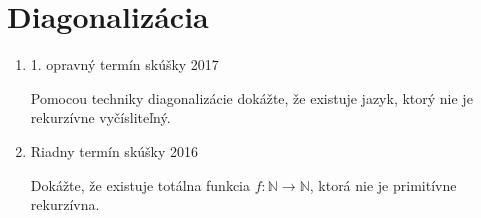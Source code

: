 \documentclass[]{article}
\begin{document}
	
	\section{Diagonalizácia}
	
	\begin{enumerate}
		\item 1. opravný termín skúšky 2017
		
		Pomocou techniky diagonalizácie dokážte, že existuje jazyk, ktorý nie je rekurzívne vyčísliteľný.
		\item Riadny termín skúšky 2016
		
		Dokážte, že existuje totálna funkcia $f: \mathbb{N} \rightarrow \mathbb{N}$, ktorá nie je primitívne rekurzívna.
		
	\end{enumerate}
	
\end{document}
